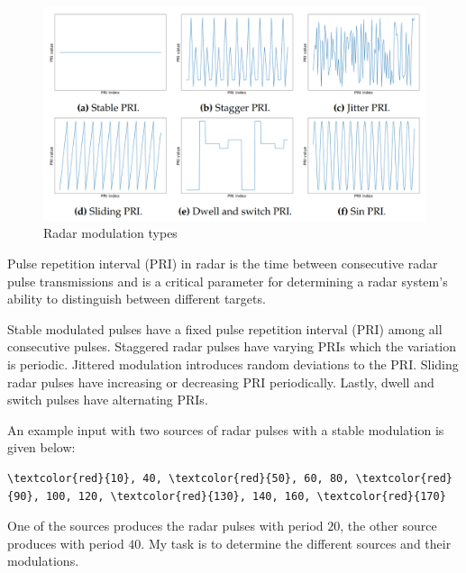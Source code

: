 \documentclass[12pt]{report}
\begin{document}
            \begin{figure}[h]
                \includegraphics[scale=0.275]{pri-modulations}
                \centering
                \caption{Radar modulation types}
            \end{figure}
            \bigskip

            Pulse repetition interval (PRI) in radar is the time between consecutive radar pulse transmissions and is a critical parameter for determining a radar system's ability to distinguish between different targets.

            Stable modulated pulses have a fixed pulse repetition interval (PRI) among all consecutive pulses. Staggered radar pulses have varying PRIs which the variation is periodic. Jittered modulation
            introduces random deviations to the PRI. Sliding radar pulses have increasing or decreasing PRI periodically. Lastly, dwell and switch pulses have alternating PRIs. \newline

            An example input with two sources of radar pulses with a stable modulation is given below:

            \begin{Verbatim}[commandchars=\\\{\}]
                \textcolor{red}{10}, 40, \textcolor{red}{50}, 60, 80, \textcolor{red}{90}, 100, 120, \textcolor{red}{130}, 140, 160, \textcolor{red}{170} 
            \end{Verbatim}
    
            One of the sources produces the radar pulses with period $20$, the other source produces with period $40$. My task is to determine the different sources and their modulations. 

            \pagebreak
\end{document}
